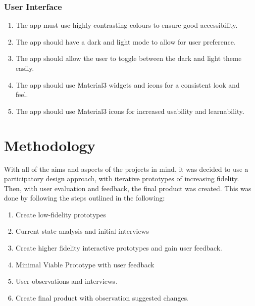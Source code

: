 \documentclass [11pt,a4paper]{article}
\begin{document}
\subsubsection{User Interface}
\label{sec:spec_ui}
\begin{enumerate}[label={\fbox{INTF\_SPEC\_\arabic*}}, leftmargin=*, labelindent=\parindent]
    \item The app must use highly contrasting colours to ensure good accessibility. \label{spec_ui_1}
    \item The app should have a dark and light mode to allow for user preference. \label{spec_ui_2}
    \item The app should allow the user to toggle between the dark and light theme easily.  \label{spec_ui_3}
    \item The app should use Material3 widgets and icons for a consistent look and feel. \label{spec_ui_4}
    \item The app should use Material3 icons for increased usability and learnability. \label{spec_ui_5}
\end{enumerate}

\section{Methodology}
\label{sec:methodology}



With all of the aims and aspects of the projects in mind, it was decided to use a participatory design approach, with iterative prototypes of increasing fidelity. Then, with user evaluation and feedback, the final product was created. This was done by following the steps outlined in the following:

\begin{enumerate}
    \item Create low-fidelity prototypes
    \item Current state analysis and initial interviews
    \item Create higher fidelity interactive prototypes and gain user feedback.
    \item Minimal Viable Prototype with user feedback
    \item User observations and interviews.
    \item Create final product with observation suggested changes.
\end{enumerate}
\end{document}
